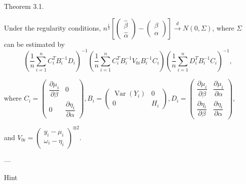 \documentclass[UTF8,a4paper,10pt]{article}
\begin{document}
\begin{Problem}[]{}
  Theorem 3.1. 
  
  Under the regularity conditions, $n^{\frac{1}{2}}\left[\left(\begin{array}{l}\hat{\beta} \\ \hat{\alpha}\end{array}\right)-\left(\begin{array}{l}\beta \\ \alpha\end{array}\right)\right] \stackrel{d}{\rightarrow} N(0, \Sigma)$, where $\Sigma$ can be estimated by 
  \[\left(\frac{1}{n} \sum_{i=1}^{n} C_{i}^{T} B_{i}^{-1} D_{i}\right)^{-1}\left(\frac{1}{n} \sum_{i=1}^{n} C_{i}^{T} B_{i}^{-1} V_{0 i} B_{i}^{-1} C_{i}\right)\left(\frac{1}{n} \sum_{i=1}^{n} D_{i}^{T} B_{i}^{-1} C_{i}\right)^{-1},\]

  where $C_{i}=\left(\begin{array}{cc}\dfrac{\partial \mu_{i}}{\partial \beta} & 0 \\ 0 & \dfrac{\partial \eta_{i}}{\partial \alpha}\end{array}\right), B_{i}=\left(\begin{array}{cc}\operatorname{Var}\left(Y_{i}\right) & 0 \\ 0 & H_{i}\end{array}\right), D_{i}=\left(\begin{array}{cc}\dfrac{\partial \mu_{i}}{\partial \beta} & \dfrac{\partial \mu_{i}}{\partial \alpha} \\ \dfrac{\partial \eta_{i}}{\partial \beta} & \dfrac{\partial \eta_{i}}{\partial \alpha}\end{array}\right)$, 
  
  and $V_{0 i}=\left(\begin{array}{c}y_{i}-\mu_{i} \\ \omega_{i}-\eta_{i}\end{array}\right)^{\otimes 2}$.

  ---
  
Hint


\end{Problem}
\end{document}
